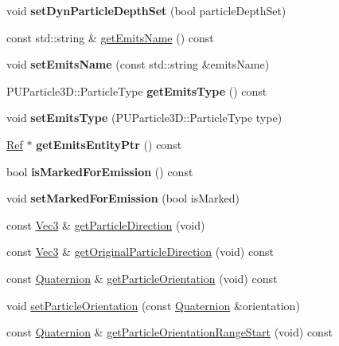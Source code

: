\begin{DoxyCompactItemize}
void {\bfseries set\+Dyn\+Particle\+Depth\+Set} (bool particle\+Depth\+Set)
\item 
const std\+::string \& \hyperlink{classPUEmitter_a76f44863dbb18531c52c4568a8aa0c0f}{get\+Emits\+Name} () const
\item 
\mbox{\label{classPUEmitter_a334fbdd4e50e5a646cce7bc2c4614776}} 
void {\bfseries set\+Emits\+Name} (const std\+::string \&emits\+Name)
\item 
\mbox{\label{classPUEmitter_af3e3054ec17f77bb902bf389d15b40c2}} 
P\+U\+Particle3\+D\+::\+Particle\+Type {\bfseries get\+Emits\+Type} () const
\item 
\mbox{\label{classPUEmitter_ab5ecb43cd684cfbce8b2c635a425c79e}} 
void {\bfseries set\+Emits\+Type} (P\+U\+Particle3\+D\+::\+Particle\+Type type)
\item 
\mbox{\label{classPUEmitter_ab0b8c4379e2449e1d645c4b5ffee9ffe}} 
\hyperlink{classRef}{Ref} $\ast$ {\bfseries get\+Emits\+Entity\+Ptr} () const
\item 
\mbox{\label{classPUEmitter_a5526e10e83497b74af1d24f15a854192}} 
bool {\bfseries is\+Marked\+For\+Emission} () const
\item 
\mbox{\label{classPUEmitter_a588139d063d1db43370d8b162b04a5d6}} 
void {\bfseries set\+Marked\+For\+Emission} (bool is\+Marked)
\item 
const \hyperlink{classVec3}{Vec3} \& \hyperlink{classPUEmitter_acece8a53bd063e9e985448dc06172ec2}{get\+Particle\+Direction} (void)
\item 
const \hyperlink{classVec3}{Vec3} \& \hyperlink{classPUEmitter_a6170df988376870b0963858332c3c2c7}{get\+Original\+Particle\+Direction} (void) const
\item 
const \hyperlink{classQuaternion}{Quaternion} \& \hyperlink{classPUEmitter_ad05c7389243abf1464e26062adf56223}{get\+Particle\+Orientation} (void) const
\item 
void \hyperlink{classPUEmitter_ab71781433c3f2547008a71de464d615a}{set\+Particle\+Orientation} (const \hyperlink{classQuaternion}{Quaternion} \&orientation)
\item 
const \hyperlink{classQuaternion}{Quaternion} \& \hyperlink{classPUEmitter_a33f20cb802c479d1816f6ffc561c65fe}{get\+Particle\+Orientation\+Range\+Start} (void) const

\end{DoxyCompactItemize}
